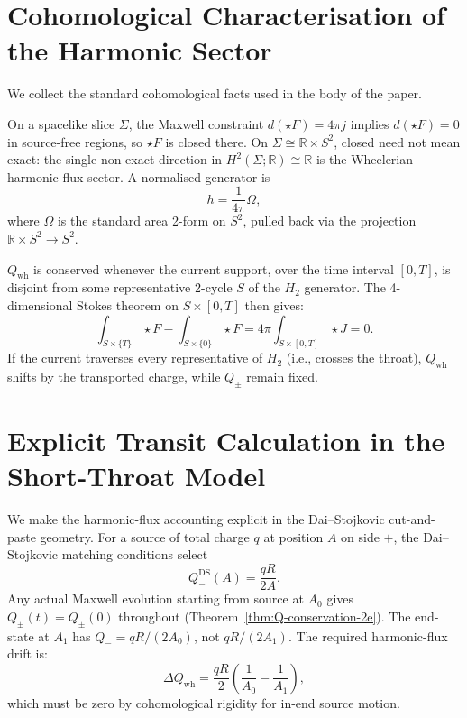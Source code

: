 \documentclass[aps,prd,onecolumn,nofootinbib,superscriptaddress]{revtex4-2}
\begin{document}
\appendix

\section{Cohomological Characterisation of the Harmonic Sector}
\label{app:cohomology}

We collect the standard cohomological facts used in the body of the paper.

On a spacelike slice $\Sigma$, the Maxwell constraint $d(\star F)=4\pi j$
implies $d(\star F)=0$ in source-free regions, so $\star F$ is closed there.
On $\Sigma\cong\mathbb{R}\times S^2$, closed need not mean exact: the single
non-exact direction in $H^2(\Sigma;\mathbb{R})\cong\mathbb{R}$ is the
Wheelerian harmonic-flux sector.  A normalised generator is
\begin{equation}
  h = \frac{1}{4\pi}\Omega,
\end{equation}
where $\Omega$ is the standard area 2-form on $S^2$, pulled back via the
projection $\mathbb{R}\times S^2\to S^2$.

$Q_{\mathrm{wh}}$ is conserved whenever the current support, over the time
interval $[0,T]$, is disjoint from some representative 2-cycle $S$ of the
$H_2$ generator.  The 4-dimensional Stokes theorem on $S\times[0,T]$ then
gives:
\begin{equation}
  \int_{S\times\{T\}}\star F - \int_{S\times\{0\}}\star F
  = 4\pi\int_{S\times[0,T]}\star J = 0.
\end{equation}
If the current traverses every representative of $H_2$ (i.e., crosses the
throat), $Q_{\mathrm{wh}}$ shifts by the transported charge, while $Q_\pm$
remain fixed.

\section{Explicit Transit Calculation in the Short-Throat Model}
\label{app:transit}

We make the harmonic-flux accounting explicit in the Dai--Stojkovic
cut-and-paste geometry.  For a source of total charge $q$ at position $A$ on
side $+$, the Dai--Stojkovic matching conditions select
\begin{equation}
Q_-^{\mathrm{DS}}(A) = \frac{qR}{2A}.
\end{equation}
Any actual Maxwell evolution starting from source at $A_0$ gives
$Q_\pm(t)=Q_\pm(0)$ throughout (Theorem~\ref{thm:Q-conservation-2e}).  The
end-state at $A_1$ has $Q_-=qR/(2A_0)$, not $qR/(2A_1)$.  The required
harmonic-flux drift is:
\begin{equation}
\Delta Q_{\mathrm{wh}} = \frac{qR}{2}\!\left(\frac{1}{A_0}-\frac{1}{A_1}\right),
\end{equation}
which must be zero by cohomological rigidity for in-end source motion.
\end{document}
